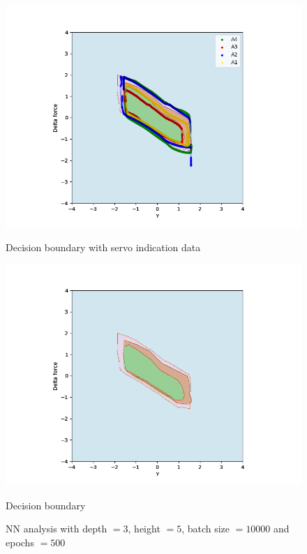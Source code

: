            \begin{figure}[]
                \begin{minipage}[b]{0.5\linewidth}
                    \centering
                    \includegraphics[width = 1\textwidth]{figures/analysis/nn/neural_net_h5_d3_e500_b10000.png}
                    \caption*{Decision boundary with servo indication data}
                \end{minipage}
                \hfill
                \begin{minipage}[b]{0.5\linewidth}
                    \centering
                    \includegraphics[width = 1\textwidth]{figures/analysis/nn/neural_net_h5_d3_e500_b10000countour.png}
                    \caption*{Decision boundary}
                \end{minipage}
                \caption{NN analysis with depth $= 3$, height $=5$, batch size $=10000$ and epochs $=500$}
                \label{fig:nn_servo_best_fit}
                
            \end{figure}
            
